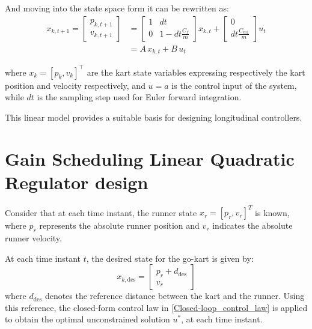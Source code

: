 \documentclass[a4paper,12pt,oneside]{book}
\begin{document}
And moving into the state space form it can be rewritten as:
\begin{equation}
    \begin{aligned}
    	x_{k,t+1} = 
    		\begin{bmatrix}
    			p_{k,t+1} \\
    			v_{k,t+1}
    		\end{bmatrix}
    		& =
    		\begin{bmatrix}
    			1 & dt \\
    			0 & 1-dt\frac{C_f}{m}
    		\end{bmatrix}
    		x_{k,t}
    		+
    		\begin{bmatrix}
    			0 \\
    			dt \frac{C_{m1}}{m}
    		\end{bmatrix}
    		u_t \\
    		& = A \, x_{k,t} + B \, u_t
    \end{aligned}
\label{Linear_system}
\end{equation}

where $x_k = [p_k , v_k] ^\top$  are the kart state variables expressing respectively the kart position and velocity respectively, and $u = a$ is the control input of the system, while $dt$ is the sampling step used for Euler forward integration.

This linear model provides a suitable basis for designing longitudinal controllers.


\section{Gain Scheduling Linear Quadratic Regulator design}
Consider that at each time instant, the runner state $x_r =[p_r , v_r] ^T $ is known, where $p_r$ represents the absolute runner position and $v_r$ indicates the absolute runner velocity.

At each time instant $t$, the desired state for the go-kart is given by:
\begin{equation}
    x_{k,\text{des}} =
    \begin{bmatrix}
        p_r + d_{\text{des}} \\
        v_r
    \end{bmatrix}
\end{equation}
where $d_{\text{des}}$ denotes the reference distance between the kart and the runner.
Using this reference, the closed-form control law in \eqref{Closed-loop_control_law} is applied to obtain the optimal unconstrained solution $u^*$, at each time instant.
\end{document}
